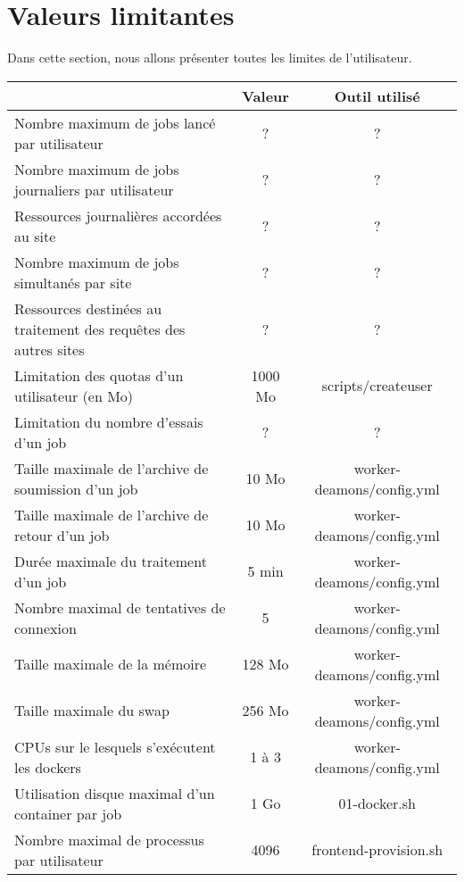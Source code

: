 \section{Valeurs limitantes}

Dans cette section, nous allons présenter toutes les limites de l'utilisateur.


\begin{center}
	\begin{tabular}{| L{8cm} | c | c |}
		\hline
		  & {\bf Valeur} & {\bf Outil utilisé} \\ \hline
		Nombre maximum de jobs lancé par utilisateur & ? & ? \\ \hline
		Nombre maximum de jobs journaliers par utilisateur & ? & ? \\ \hline
		Ressources journalières accordées au site & ? & ? \\ \hline
		Nombre maximum de jobs simultanés par site & ? & ? \\ \hline
		Ressources destinées au traitement des requêtes des autres sites & ? & ? \\ \hline
		Limitation des quotas d'un utilisateur (en Mo) & 1000 Mo & scripts/createuser \\ \hline
		Limitation du nombre d'essais d'un job & ? & ? \\ \hline
		Taille maximale de l'archive de soumission d'un job & 10 Mo & worker-deamons/config.yml \\ \hline
		Taille maximale de l'archive de retour d'un job & 10 Mo & worker-deamons/config.yml \\ \hline
		Durée maximale du traitement d'un job & 5 min & worker-deamons/config.yml \\ \hline
		Nombre maximal de tentatives de connexion & 5 & worker-deamons/config.yml \\ \hline
		Taille maximale de la mémoire & 128 Mo & worker-deamons/config.yml \\ \hline
		Taille maximale du swap & 256 Mo & worker-deamons/config.yml \\ \hline
		CPUs sur le lesquels s'exécutent les dockers & 1 à 3 & worker-deamons/config.yml \\ \hline
		Utilisation disque maximal d'un container par job & 1 Go & 01-docker.sh \\ \hline
		Nombre maximal de processus par utilisateur & 4096 & frontend-provision.sh \\ \hline
	\end{tabular}
\end{center}
